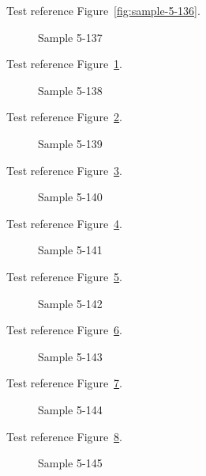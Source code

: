 Test reference Figure~\ref{fig:sample-5-136}.

\begin{figure}[tbhp]
\caption{Sample 5-137}
\label{fig:sample-5-137}
\end{figure}

Test reference Figure~\ref{fig:sample-5-137}.

\begin{figure}[tbhp]
\caption{Sample 5-138}
\label{fig:sample-5-138}
\end{figure}

Test reference Figure~\ref{fig:sample-5-138}.

\begin{figure}[tbhp]
\caption{Sample 5-139}
\label{fig:sample-5-139}
\end{figure}

Test reference Figure~\ref{fig:sample-5-139}.

\begin{figure}[tbhp]
\caption{Sample 5-140}
\label{fig:sample-5-140}
\end{figure}

Test reference Figure~\ref{fig:sample-5-140}.

\begin{figure}[tbhp]
\caption{Sample 5-141}
\label{fig:sample-5-141}
\end{figure}

Test reference Figure~\ref{fig:sample-5-141}.

\begin{figure}[tbhp]
\caption{Sample 5-142}
\label{fig:sample-5-142}
\end{figure}

Test reference Figure~\ref{fig:sample-5-142}.

\begin{figure}[tbhp]
\caption{Sample 5-143}
\label{fig:sample-5-143}
\end{figure}

Test reference Figure~\ref{fig:sample-5-143}.

\begin{figure}[tbhp]
\caption{Sample 5-144}
\label{fig:sample-5-144}
\end{figure}

Test reference Figure~\ref{fig:sample-5-144}.

\begin{figure}[tbhp]
\caption{Sample 5-145}
\label{fig:sample-5-145}
\end{figure}

